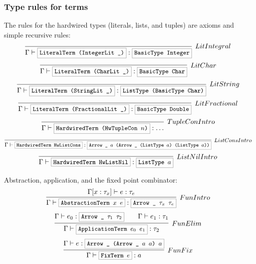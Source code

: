 \documentclass[a4paper]{scrartcl}
\newcommand{\hsterm}[1]{%
    \setlength{\fboxsep}{3pt}%
    \setlength{\fboxrule}{0.2pt}%
    \fbox{\texttt{\small #1}}}
\begin{document}
\subsubsection{Type rules for terms}
The rules for the hardwired types (literals, lists, and tuples) are axioms
and simple recursive rules:
\begin{equation*}
\infer[LitIntegral]%
    {\Gamma \vdash \hsterm{LiteralTerm (IntegerLit \_)} : \hsterm{BasicType Integer}}%
    {}
\end{equation*}\begin{equation*}
\infer[LitChar]%
    {\Gamma \vdash \hsterm{LiteralTerm (CharLit \_)} : \hsterm{BasicType Char}}%
    {}
\end{equation*}\begin{equation*}
\infer[LitString]%
    {\Gamma \vdash \hsterm{LiteralTerm (StringLit \_)} : \hsterm{ListType (BasicType Char)}}%
    {}
\end{equation*}\begin{equation*}
\infer[LitFractional]%
    {\Gamma \vdash \hsterm{LiteralTerm (FractionalLit \_)} : \hsterm{BasicType Double}}%
    {}
\end{equation*}\begin{equation*}
\infer[TupleConIntro]%
    {\Gamma \vdash \hsterm{HardwiredTerm (HwTupleCon \ensuremath{n})} : \ldots}%
    {}
\end{equation*}\begin{equation*}
\infer[ListConsIntro]%
    {\Gamma \vdash \hsterm{HardwiredTerm HwListCons} : \hsterm{Arrow \_ \ensuremath{a} (Arrow \_ (ListType \ensuremath{a}) (ListType \ensuremath{a}))}}%
    {}
\end{equation*}\begin{equation*}
\infer[ListNilIntro]%
    {\Gamma \vdash \hsterm{HardwiredTerm HwListNil} : \hsterm{ListType \ensuremath{a}}}%
    {}
\end{equation*}

Abstraction, application, and the fixed point combinator:
\begin{equation*}
\infer[FunIntro]%
    {\Gamma \vdash \hsterm{AbstractionTerm \ensuremath{x} \ensuremath{e}} : \hsterm{Arrow \_ \ensuremath{\tau_x} \ensuremath{\tau_e}}}%
    {\Gamma [x : \tau_x] \vdash e : \tau_e}%
\end{equation*}\begin{equation*}
\infer[FunElim]%
    {\Gamma \vdash \hsterm{ApplicationTerm \ensuremath{e_0} \ensuremath{e_1}} : \tau_2}%
    {\Gamma \vdash e_0 : \hsterm{Arrow \_ \ensuremath{\tau_1} \ensuremath{\tau_2}} \qquad \Gamma \vdash e_1 : \tau_1}%
\end{equation*}\begin{equation*}
\infer[FunFix]%
    {\Gamma \vdash \hsterm{FixTerm \ensuremath{e}} : \ensuremath{a}}%
    {\Gamma \vdash \ensuremath{e} : \hsterm{Arrow \_ (Arrow \_ \ensuremath{a} \ensuremath{a}) \ensuremath{a}}}
\end{equation*}
\end{document}
